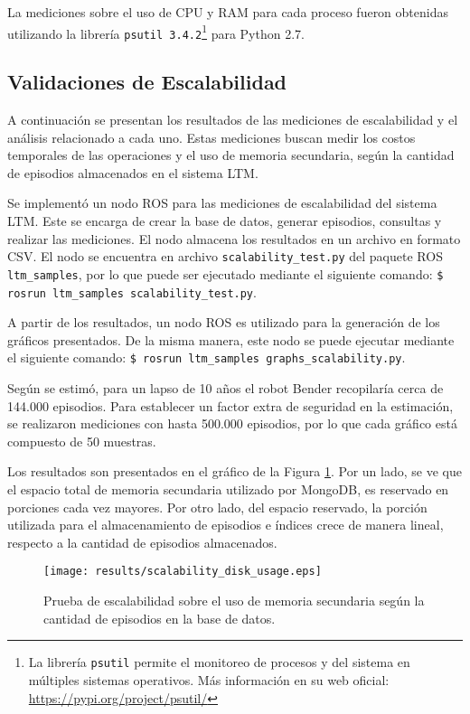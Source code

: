 La mediciones sobre el uso de CPU y RAM para cada proceso fueron obtenidas utilizando la librería \texttt{psutil 3.4.2}\footnote{La librería \texttt{psutil} permite el monitoreo de procesos y del sistema en múltiples sistemas operativos. Más información en su web oficial: \url{https://pypi.org/project/psutil/}} para Python 2.7.


\subsection{Validaciones de Escalabilidad}

A continuación se presentan los resultados de las mediciones de escalabilidad y el análisis relacionado a cada uno. Estas mediciones buscan medir los costos temporales de las operaciones y el uso de memoria secundaria, según la cantidad de episodios almacenados en el sistema LTM.

 Se implementó un nodo ROS para las mediciones de escalabilidad del sistema LTM. Este se encarga de crear la base de datos, generar episodios, consultas y realizar las mediciones. El nodo almacena los resultados en un archivo en formato CSV. El nodo se encuentra en archivo \texttt{scalability\_test.py} del paquete ROS \texttt{ltm\_samples}, por lo que puede ser ejecutado mediante el siguiente comando: \texttt{\$ rosrun ltm\_samples scalability\_test.py}.

A partir de los resultados, un nodo ROS es utilizado para la generación de los gráficos presentados. De la misma manera, este nodo se puede ejecutar mediante el siguiente comando:
\texttt{\$ rosrun ltm\_samples graphs\_scalability.py}.

Según se estimó, para un lapso de 10 años el robot Bender recopilaría cerca de 144.000 episodios. Para establecer un factor extra de seguridad en la estimación, se realizaron mediciones con hasta 500.000 episodios, por lo que cada gráfico está compuesto de 50 muestras.

 Los resultados son presentados en el gráfico de la Figura \ref{result:scalability_disk_usage}.  Por un lado, se ve que el espacio total de memoria secundaria utilizado por MongoDB, es reservado en porciones cada vez mayores. Por otro lado, del espacio reservado, la porción utilizada para el almacenamiento de episodios e índices crece de manera lineal, respecto a la cantidad de episodios almacenados.

\begin{figure}[!ht]
	\centering
	\texttt{[image: results/scalability\_disk\_usage.eps]}
	\caption[Escalabilidad: Uso de disco según cantidad de episodios.]
	{\small Prueba de escalabilidad sobre el uso de memoria secundaria  según la cantidad de episodios en la base de datos.}
	\label{result:scalability_disk_usage}
\end{figure}


